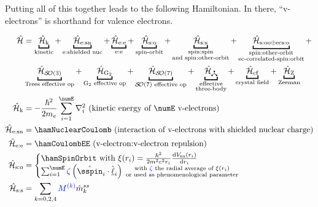 \documentclass{article}
\begin{document}
Putting all of this together leads to the following Hamiltonian. In there, ``v-electrons'' is shorthand for valence electrons.

\begin{mdframed}
\begin{align} 
	\ham &= \underbracket{\hamKineticSymbol}_{\text{kinetic}}
		 + \underbracket{\hamNuclearCoulombSymbol}_{\text{e:shielded nuc}}
		 + \underbracket{\hamCoulombEESymbol}_{\text{e:e}}
		 + \underbracket{\hamSpinOrbitSymbol}_{\text{spin-orbit}}
		 + \underbracket{\hamSpinSpinSymbol}_{
		 			\substack{
		 				\text{spin:spin} \\ 
		 				\text{and spin:other-orbit}
		 				}
		 			} 
         + \underbracket{\hamSOOplusECSOSymbol}_{
            \substack{
                \text{spin:other-orbit} \\ 
                \text{ec-correlated-spin:orbit}
                }
         } + \\
         & \underbracket{\hamTreesSymbol}_\text{Trees effective op} 
		 + \underbracket{\hamGTwoSymbol}_\text{G${}_2$ effective op} 
		 + \underbracket{\hamSOSevenSymbol}_\text{$\SO{7}$ effective op} 
		 + \underbracket{\ham_{\trispoke}}_{\substack{
            \text{effective} \\
            \text{three-body}}}
         + \underbracket{\hamCrystalFieldSymbol}_{\text{crystal field}} 
         + \underbracket{\hamZeemanSymbol}_{\text{Zeeman}} \\
	\hamKineticSymbol &= -\frac{\hbar^2}{2m_e}\sum_{i=1}^\numE \nabla_i^2 \text{ (kinetic energy of $\numE$ v-electrons)}\\
	\hamNuclearCoulombSymbol &= \hamNuclearCoulomb \text{ (interaction of v-electrons with shielded nuclear charge)} \\
	\ham_\text{e:e} &= \hamCoulombEE \text{ (v-electron:v-electron repulsion)} \\  
	\hamSpinOrbitSymbol &= \begin{cases} 
			\hamSpinOrbit \text{ with } \xi{(r_i)} = \frac{\hbar^2}{2 m^2 c^2 r_i} \frac{\diff{V_\text{sn}(r_i)}}{\diff{r_i}} \\
			\sum_{i=1}^\numE \spinZeta \paren{\op{\sspin}_i \cdot \op{\lorb}_i} {{\substack{
						\text{ with $\spinZeta$ the radial average of $\xi(r_i)$} \\ 
						\text{ or used as phenomenological parameter}  
						}
					}}    
			\end{cases} \\    
	\hamSpinSpinSymbol &= \hamSpinSpin \\  

\end{align}
\end{mdframed}
\end{document}
